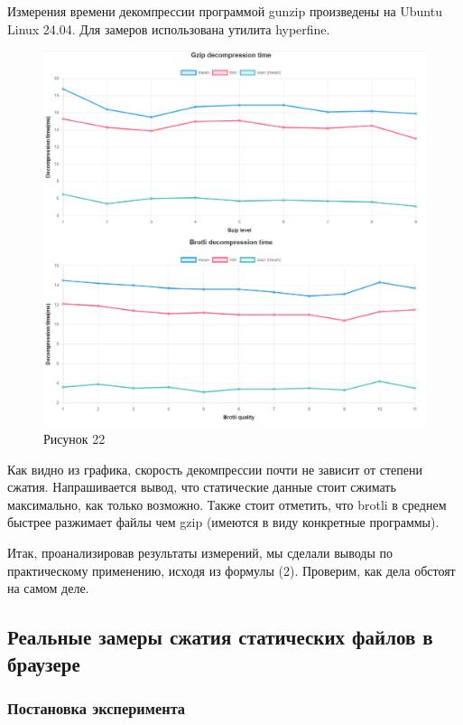 \documentclass[12pt]{article}
\begin{document}
Измерения времени декомпрессии программой gunzip произведены на Ubuntu Linux 24.04. Для замеров использована утилита hyperfine.

\begin{figure}[H]
    \centering
    \includegraphics[width=1\textwidth]{../images/Decompression_time.png}
    \caption{Рисунок 22}
\end{figure}

Как видно из графика, скорость декомпрессии почти не зависит от степени сжатия.
Напрашивается вывод, что статические данные стоит сжимать максимально, как только возможно.
Также стоит отметить, что brotli в среднем быстрее разжимает файлы чем gzip (имеются в виду конкретные программы).

Итак, проанализировав результаты измерений, мы сделали выводы по практическому применению, исходя из формулы (2). Проверим, как дела обстоят на самом деле.

\subsection{Реальные замеры сжатия статических файлов в браузере}

\subsubsection{Постановка эксперимента}
\end{document}
